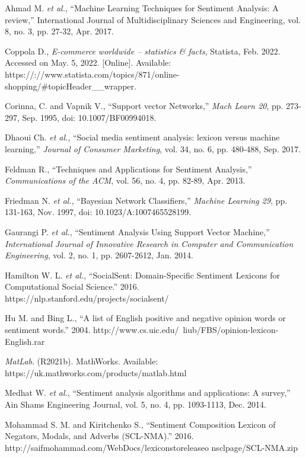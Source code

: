 \documentclass[12pt,journal,compsoc]{IEEEtran}
\begin{document}
\begin{thebibliography}{1}
  \bibitem{}
  Ahmad M. \emph{et al.}, “Machine Learning Techniques for Sentiment Analysis: A review,” International Journal of Multidisciplinary Sciences and Engineering, vol. 8, no. 3, pp. 27-32, Apr. 2017.

  \bibitem{}
  Coppola D., \emph{E-commerce worldwide – statistics \& facts}, Statista, Feb. 2022. Accessed on May. 5, 2022. [Online]. Available: https://://www.statista.com/topics/871/online-shopping/\#topicHeader\_\_wrapper.

  \bibitem{}
  Corinna, C. and Vapnik V., “Support vector Networks,” \emph{Mach Learn 20}, pp. 273-297, Sep. 1995, doi: 10.1007/BF00994018.

  \bibitem{}
  Dhaoui Ch. \emph{et al.}, “Social media sentiment analysis: lexicon versus machine learning,” \emph{Journal of Consumer Marketing}, vol. 34, no. 6, pp. 480-488, Sep. 2017.

  \bibitem{}
  Feldman R., “Techniques and Applications for Sentiment Analysis,” \emph{Communications of the ACM}, vol. 56, no. 4, pp. 82-89, Apr. 2013.

  \bibitem{}
  Friedman N. \emph{et al.}, “Bayesian Network Classifiers,” \emph{Machine Learning 29}, pp. 131-163, Nov. 1997, doi: 10.1023/A:1007465528199.

  \bibitem{}
  Gaurangi P. \emph{et al.}, “Sentiment Analysis Using Support Vector Machine,” \emph{International Journal of Innovative Research in Computer and Communication Engineering}, vol. 2, no. 1, pp. 2607-2612, Jan. 2014.

  \bibitem{}
  Hamilton W. L. \emph{et al.}, “SocialSent: Domain-Specific Sentiment Lexicons for Computational Social Science.” 2016. https://nlp.stanford.edu/projects/socialsent/

  \bibitem{}
  Hu M. and Bing L., “A list of English positive and negative opinion words or sentiment words.” 2004. http://www.cs.uic.edu/~liub/FBS/opinion-lexicon-English.rar

  \bibitem{}
  \emph{MatLab}. (R2021b). MathWorks. Available: https://uk.mathworks.com/products/matlab.html

  \bibitem{}
  Medhat W. \emph{et al.}, “Sentiment analysis algorithms and applications: A survey,” Ain Shams Engineering Journal, vol. 5, no. 4, pp. 1093-1113, Dec. 2014.

  \bibitem{}
  Mohammad S. M. and Kiritchenko S., “Sentiment Composition Lexicon of Negators, Modals, and Adverbs (SCL-NMA).” 2016. http://saifmohammad.com/WebDocs/lexiconstoreleaseo \newline nsclpage/SCL-NMA.zip


\end{thebibliography}
\end{document}
